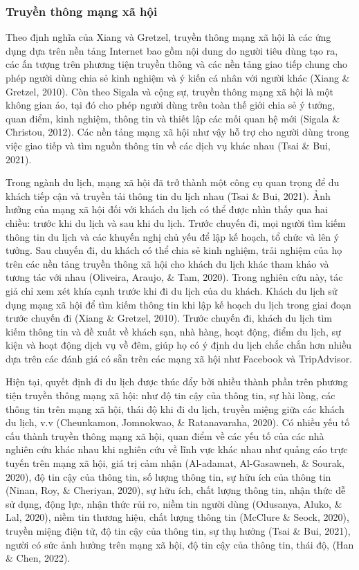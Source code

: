 		\subsubsection{Truyền thông mạng xã hội}
		
		Theo định nghĩa của Xiang và Gretzel, truyền thông mạng xã hội là các ứng dụng dựa trên nền tảng Internet bao gồm nội dung do người tiêu dùng tạo ra, các ấn tượng trên phương tiện truyền thông và các nền tảng giao tiếp chung cho phép người dùng chia sẻ kinh nghiệm và ý kiến cá nhân với người khác (Xiang \& Gretzel, 2010). Còn theo Sigala và cộng sự, truyền thông mạng xã hội là một không gian ảo, tại đó cho phép người dùng trên toàn thế giới chia sẻ ý tưởng, quan điểm, kinh nghiệm, thông tin và thiết lập các mối quan hệ mới (Sigala \& Christou, 2012). Các nền tảng mạng xã hội như vậy hỗ trợ cho người dùng trong việc giao tiếp và tìm nguồn thông tin về các dịch vụ khác nhau (Tsai \& Bui, 2021).
		
		Trong ngành du lịch, mạng xã hội đã trở thành một công cụ quan trọng để du khách tiếp cận và truyền tải thông tin du lịch nhau (Tsai \& Bui, 2021). Ảnh hưởng của mạng xã hội đối với khách du lịch có thể được nhìn thấy qua hai chiều: trước khi du lịch và sau khi du lịch. Trước chuyến đi, mọi người tìm kiếm thông tin du lịch và các khuyến nghị chủ yếu để lập kế hoạch, tổ chức và lên ý tưởng. Sau chuyến đi, du khách có thể chia sẻ kinh nghiệm, trải nghiệm của họ trên các nền tảng truyền thông xã hội cho khách du lịch khác tham khảo và tương tác với nhau (Oliveira, Araujo, \& Tam, 2020). Trong nghiên cứu này, tác giả chỉ xem xét khía cạnh trước khi đi du lịch của du khách. Khách du lịch sử dụng mạng xã hội để tìm kiếm thông tin khi lập kế hoạch du lịch trong giai đoạn trước chuyến đi (Xiang \& Gretzel, 2010). Trước chuyến đi, khách du lịch tìm kiếm thông tin và đề xuất về khách sạn, nhà hàng, hoạt động, điểm du lịch, sự kiện và hoạt động dịch vụ về đêm, giúp họ có ý định du lịch chắc chắn hơn nhiều dựa trên các đánh giá có sẵn trên các mạng xã hội như Facebook và TripAdvisor.
		
		Hiện tại, quyết định đi du lịch được thúc đẩy bởi nhiều thành phần trên phương tiện truyền thông mạng xã hội: như độ tin cậy của thông tin, sự hài lòng, các thông tin trên mạng xã hội, thái độ khi đi du lịch, truyền miệng giữa các khách du lịch, v.v (Cheunkamon, Jomnokwao, \& Ratanavaraha, 2020). Có nhiều yếu tố cấu thành truyền thông mạng xã hội, quan điểm về các yếu tố của các nhà nghiên cứu khác nhau khi nghiên cứu về lĩnh vực khác nhau như quảng cáo trực tuyến trên mạng xã hội, giá trị cảm nhận (Al-adamat, Al-Gasawneh, \& Sourak, 2020), độ tin cậy của thông tin, số lượng thông tin, sự hữu ích của thông tin (Ninan, Roy, \& Cheriyan, 2020), sự hữu ích, chất lượng thông tin, nhận thức dễ sử dụng, động lực, nhận thức rủi ro, niềm tin người dùng (Odusanya, Aluko, \& Lal, 2020), niềm tin thương hiệu, chất lượng thông tin (McClure \& Seock, 2020), truyền miệng điện tử, độ tin cậy của thông tin, sự thụ hưởng (Tsai \& Bui, 2021), người có sức ảnh hưởng trên mạng xã hội, độ tin cậy của thông tin, thái độ, (Han \& Chen, 2022).
		
